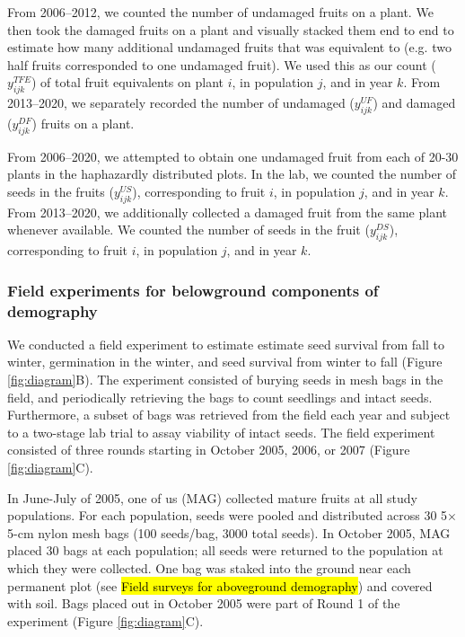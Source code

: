 \documentclass[12pt, oneside, titlepage]{article}   	%
\begin{document}
From 2006--2012, we counted the number of undamaged fruits on a plant. We then took the damaged fruits on a plant and visually stacked them end to end to estimate how many additional undamaged fruits that was equivalent to (e.g. two half fruits corresponded to one undamaged fruit). We used this as our count ($y^{TFE}_{ijk}$) of total fruit equivalents on plant $i$, in population $j$, and in year $k$. From 2013--2020, we separately recorded the number of undamaged ($y^{UF}_{ijk}$) and damaged ($y^{DF}_{ijk}$) fruits on a plant. 

From 2006--2020, we attempted to obtain one undamaged fruit from each of 20-30 plants in the haphazardly distributed plots. In the lab, we counted the number of seeds in the fruits ($y^{US}_{ijk}$), corresponding to fruit $i$, in population $j$, and in year $k$. From 2013--2020, we additionally collected a damaged fruit from the same plant whenever available. We counted the number of seeds in the fruit ($y^{DS}_{ijk}$), corresponding to fruit $i$, in population $j$, and in year $k$.

\subsubsection{Field experiments for belowground components of demography}

We conducted a field experiment to estimate estimate seed survival from fall to winter, germination in the winter, and seed survival from winter to fall (Figure \ref{fig:diagram}B). The experiment consisted of burying seeds in mesh bags in the field, and periodically retrieving the bags to count seedlings and intact seeds. Furthermore, a subset of bags was retrieved from the field each year and subject to a two-stage lab trial to assay viability of intact seeds. The field experiment consisted of three rounds starting in October 2005, 2006, or 2007 (Figure \ref{fig:diagram}C).

In June-July of 2005, one of us (MAG) collected mature fruits at all study populations. For each population, seeds were pooled and distributed across 30 5$\times$5-cm nylon mesh bags (100 seeds/bag, 3000 total seeds). In October 2005, MAG placed 30 bags at each population; all seeds were returned to the population at which they were collected. One bag was staked into the ground near each permanent plot (see \hl{Field surveys for aboveground demography}) and covered with soil. Bags placed out in October 2005 were part of Round 1 of the experiment (Figure \ref{fig:diagram}C).
\end{document}
